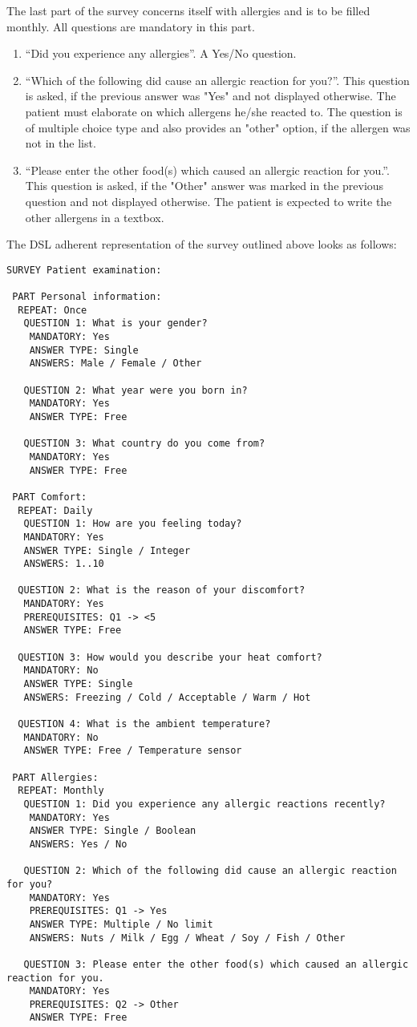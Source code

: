 The last part of the survey concerns itself with allergies and is to be filled monthly. All questions are mandatory in this part.

\begin{enumerate}
\item ``Did you experience any allergies''. A Yes/No question.
\item ``Which of the following did cause an allergic reaction for you?''. This question is asked, if the previous answer was "Yes" and not displayed otherwise. The patient must elaborate on which allergens he/she reacted to. The question is of multiple choice type and also provides an "other" option, if the allergen was not in the list.
\item ``Please enter the other food(s) which caused an allergic reaction for you.''. This question is asked, if the "Other" answer was marked in the previous question and not displayed otherwise. The patient is expected to write the other allergens in a textbox.
\end{enumerate}

The DSL adherent representation of the survey outlined above looks as follows:
\begin{verbatim}
SURVEY Patient examination:

 PART Personal information:
  REPEAT: Once
   QUESTION 1: What is your gender?
    MANDATORY: Yes
    ANSWER TYPE: Single 
    ANSWERS: Male / Female / Other
      
   QUESTION 2: What year were you born in?
    MANDATORY: Yes
    ANSWER TYPE: Free

   QUESTION 3: What country do you come from?
    MANDATORY: Yes
    ANSWER TYPE: Free
      
 PART Comfort:
  REPEAT: Daily
   QUESTION 1: How are you feeling today?
   MANDATORY: Yes
   ANSWER TYPE: Single / Integer
   ANSWERS: 1..10
   
  QUESTION 2: What is the reason of your discomfort?
   MANDATORY: Yes
   PREREQUISITES: Q1 -> <5
   ANSWER TYPE: Free
 
  QUESTION 3: How would you describe your heat comfort?
   MANDATORY: No
   ANSWER TYPE: Single
   ANSWERS: Freezing / Cold / Acceptable / Warm / Hot
 
  QUESTION 4: What is the ambient temperature?
   MANDATORY: No
   ANSWER TYPE: Free / Temperature sensor
      
 PART Allergies:  
  REPEAT: Monthly
   QUESTION 1: Did you experience any allergic reactions recently?
    MANDATORY: Yes
    ANSWER TYPE: Single / Boolean
    ANSWERS: Yes / No
 
   QUESTION 2: Which of the following did cause an allergic reaction for you?
    MANDATORY: Yes
    PREREQUISITES: Q1 -> Yes
    ANSWER TYPE: Multiple / No limit
    ANSWERS: Nuts / Milk / Egg / Wheat / Soy / Fish / Other
 
   QUESTION 3: Please enter the other food(s) which caused an allergic reaction for you.
    MANDATORY: Yes
    PREREQUISITES: Q2 -> Other
    ANSWER TYPE: Free
\end{verbatim}

